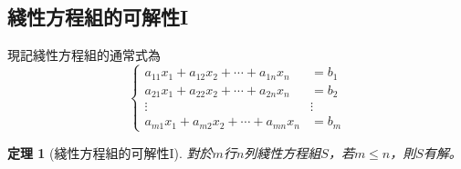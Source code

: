 \documentclass[12pt]{article}
\newtheorem*{theorem}{定理}
\begin{document}
    \subsection*{綫性方程組的可解性I}

    現記綫性方程組的通常式為
    $$\begin{cases}
        a_{11}x_1+a_{12}x_2+\cdots+a_{1n}x_{n}&=b_1\\
        a_{21}x_1+a_{22}x_2+\cdots+a_{2n}x_{n}&=b_2\\
        \vdots&\vdots\\
        a_{m1}x_1+a_{m2}x_2+\cdots+a_{mn}x_{n}&=b_m
    \end{cases}$$
    
    \begin{theorem}[綫性方程組的可解性I]
        對於$m$行$n$列綫性方程組$S$，若$m\leq n$，則$S$有解。
    \end{theorem}
    
\end{document}
